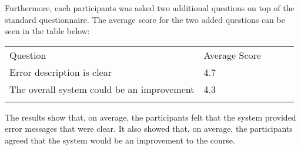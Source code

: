 Furthermore, each participants was asked two additional questions on top of the standard questionnaire. The average score for the two added questions can be seen in the table below:
\begin{table}[H]
\centering
\begin{tabular}{lllll}
\cline{1-2}
\multicolumn{1}{|l|}{\cellcolor[HTML]{C0C0C0}Question}           & \multicolumn{1}{l|}{\cellcolor[HTML]{C0C0C0}Average Score} &  &  &  \\ \cline{1-2}
\multicolumn{1}{|l|}{Error description is clear}                 & \multicolumn{1}{l|}{4.7}                                    &  &  &  \\ \cline{1-2}
\multicolumn{1}{|l|}{The overall system could be an improvement} & \multicolumn{1}{l|}{4.3}                                    &  &  &  \\ \cline{1-2}
                                                                 &                                                           &  &  &
\end{tabular}
\end{table}
The results show that, on average, the participants felt that the system provided error messages that were clear.
It also showed that, on average, the participants agreed that the system would be an improvement to the course.